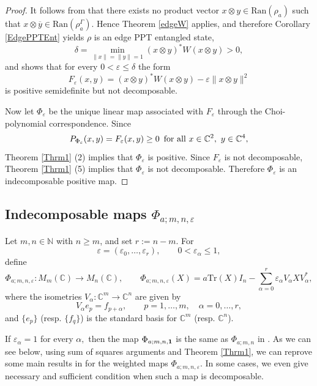 \documentclass[12pt,a4paper]{amsart}
\theoremstyle{plain}
\theoremstyle{remark}
\theoremstyle{definition}
\newcommand{\Tr}{{\textrm{Tr}}}
\begin{document}
\begin{proof}
It follows from \cite{Horodecki1997} that there exists no product vector $ x \otimes y\in \mathrm{Ran}(\rho_a)$ such that $x \otimes \overline{y} \in \mathrm{Ran}(\rho_a^\Gamma).$  
Hence
Theorem \ref{edgeW} applies, and therefore Corollary \ref{EdgePPTEnt} yields \(\rho\) is an edge PPT entangled state, 
\[
\delta=\min_{\|x\|=\|y\|=1}(x\otimes y)^*W(x\otimes y)>0,
\]
and shows that for every $0<\varepsilon\le\delta$ the form
\[
F_\varepsilon(x,y)=(x\otimes y)^*W(x\otimes y)-\varepsilon\|x\otimes y\|^2
\]
is positive semidefinite but not decomposable.

Now let $\Phi_\varepsilon$ be the unique linear map associated with $F_\varepsilon$
through the Choi-polynomial correspondence. Since
\[
P_{\Phi_\varepsilon}(x,y)=F_\varepsilon(x,y)\ge 0
\enskip  \text{for all }x\in\mathbb C^2,\ y\in\mathbb C^4,
\]
Theorem \ref{Thrm1} (2) implies that $\Phi_\varepsilon$ is positive. Since $F_\varepsilon$
is not decomposable, Theorem \ref{Thrm1} (5) implies that $\Phi_\varepsilon$ is not
decomposable. Therefore $\Phi_\varepsilon$ is an indecomposable positive map.
\end{proof}

	

\subsection{Indecomposable maps $\Phi_{a;m,n,\varepsilon}$}


Let $m, n \in \mathbb{N}$ with $n \ge m$, and set $r := n - m$. For
$$\varepsilon = (\varepsilon_0, \dots, \varepsilon_r), \qquad 0 < \varepsilon_\alpha \le 1,$$
define
\[
\Phi_{a;m,n,\varepsilon}: M_m(\mathbb{C}) \to M_n(\mathbb{C}), \qquad
\Phi_{a;m,n,\varepsilon}(X) = a \Tr(X)I_n - \sum_{\alpha=0}^{r} \varepsilon_\alpha V_\alpha X V_\alpha^*,
\]
where the isometries $V_\alpha: \mathbb{C}^m \to \mathbb{C}^n$ are given by
\[
V_\alpha e_p = f_{p+\alpha}, \qquad p = 1, \dots, m, \quad \alpha = 0, \dots, r,
\]
and $\{e_p\}$ (resp. $\{f_q\}$) is the standard basis for $\mathbb{C}^m$ (resp. $\mathbb{C}^n$).

If $\varepsilon_{\alpha} =1$ for every $\alpha,$ then the map $\Phi_{a;m,n,\bold{1}}$ is the same as $\Phi_{a;m,n}$ in \cite{Mlynik2025}. As we can see below, using sum of squares arguments and Theorem \ref{Thrm1}, we can reprove some main results in \cite{Mlynik2025} for the weighted maps $\Phi_{a;m,n,\varepsilon}.$ In some cases, we even give necessary and sufficient condition when such a map is decomposable.
 
\end{document}
